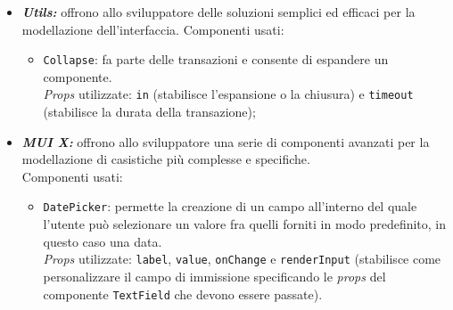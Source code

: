 \begin{itemize}
\begin{itemize}
      \item \texttt{Grid}: permette la creazione di una griglia per l'organizzazione dei contenuti.\\
      \textit{Props} utilizzate: \texttt{container} (stabilisce che il componente ha lo stesso comportamento di un contenitore a cui è attribuita la proprietà \texttt{flex}), \texttt{spacing} (stabilisce la spaziatura fra i diversi componenti di tipo \texttt{item}; funziona solamente componenti di tipo \texttt{container}), \texttt{item} (stabilisce che il componente è di tipo \texttt{item}, quindi figlio del componente di tipo \texttt{container}), \texttt{xs/md/lg} (quando il loro valore è un numero\footnote{Il valore numerico associato alle \textit{prop} \texttt{xs/md/lg} non può mai essere superiore a \texttt{12}, ovvero il numero totale di colonne presenti all'interno di un contenitore.}, stabilisce la spaziatura fra i componenti di tipo \texttt{item}; a seconda di quale delle tre \textit{props} viene fornita, il valore numerico viene applicato ai \textit{breakpoint} \texttt{xs}, \texttt{md} o \texttt{lg});
    \end{itemize}

  \item \textbf{\textit{Utils:}} offrono allo sviluppatore delle soluzioni semplici ed efficaci per la modellazione dell'interfaccia.
  Componenti usati:
  \begin{itemize}
    \item \texttt{Collapse}: fa parte delle transazioni e consente di espandere un componente.\\
    \textit{Props} utilizzate: \texttt{in} (stabilisce l'espansione o la chiusura) e \texttt{timeout} (stabilisce la durata della transazione);
  \end{itemize}

  \item \textbf{\textit{MUI X:}} offrono allo sviluppatore una serie di componenti avanzati per la modellazione di casistiche più complesse e specifiche.\\
  Componenti usati:
  \begin{itemize}
    \item \texttt{DatePicker}: permette la creazione di un campo all'interno del quale l'utente può selezionare un valore fra quelli forniti in modo predefinito, in questo caso una data.\\
    \textit{Props} utilizzate: \texttt{label}, \texttt{value}, \texttt{onChange} e \texttt{renderInput} (stabilisce come personalizzare il campo di immissione specificando le \textit{props} del componente \texttt{TextField} che devono essere passate).
  \end{itemize}
\end{itemize}
  
